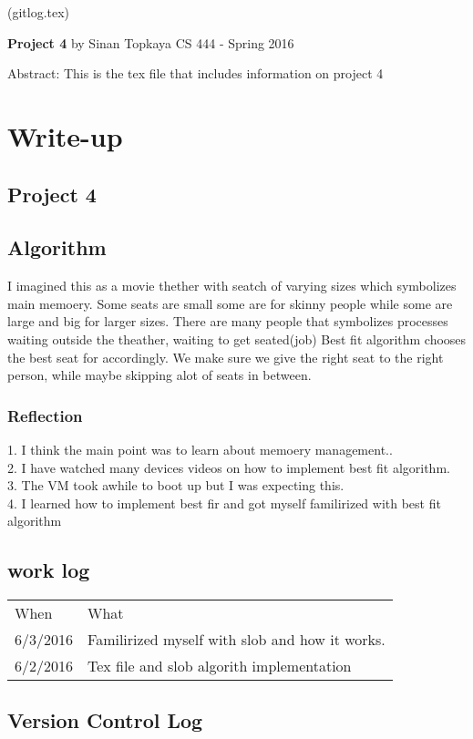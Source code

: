 \documentclass[letterpaper,10pt,draftclsnofoot,onecolumn]{IEEEtran}
\begin{document}
	(gitlog.tex)
	\begin{titlepage}
		
		\begin{center}
		\bigbreak	
		\textbf{Project 4}
		\bigbreak
		by Sinan Topkaya
		\smallbreak
		CS 444 - Spring 2016
		\end{center}
		\vfill
		
		Abstract: This is the tex file that includes information on project 4	
	\end{titlepage}

\section*{Write-up}
\subsection*{Project 4}


\subsection*{Algorithm}

I imagined this as a movie thether with seatch of varying sizes which symbolizes main memoery. Some seats are small some are for skinny people while some are large and big for larger sizes. There are many people that symbolizes processes waiting outside the theather, waiting to get seated(job) Best fit algorithm chooses the best seat for accordingly. We make sure we give the right seat to the right person, while maybe skipping alot of seats in between.

\subsubsection*{Reflection}
	1. I think the main point was to learn about memoery management..\\
	2. I have watched many devices videos on how to implement best fit algorithm.\\
	3. The VM took awhile to boot up but I was expecting this.\\
	4. I learned how to implement best fir and got myself familirized with best fit algorithm\\

\subsection*{work log}
\begin{center}
\begin{tabular}{ |m{2cm}|m{5cm}| }
\hline
When & What \\
6/3/2016 & Familirized myself with slob and how it works.\\
6/2/2016 & Tex file and slob algorith implementation\\

\hline
\end{tabular}
\end{center}

\subsection*{Version Control Log}

\end{document}
